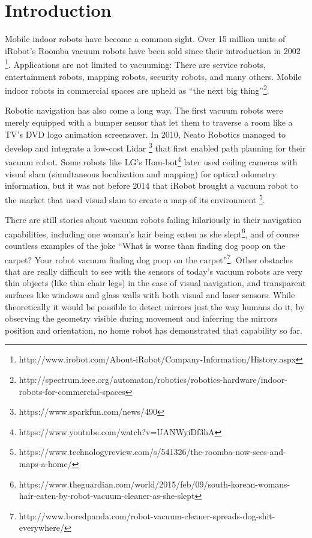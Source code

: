 \chapter{Introduction}\label{introduction}

Mobile indoor robots have become a common sight. Over 15 million units
of iRobot's Roomba vacuum robots have been sold since their introduction
in 2002 \footnote{http://www.irobot.com/About-iRobot/Company-Information/History.aspx}.
Applications are not limited to vacuuming: There are service robots,
entertainment robots, mapping robots, security robots, and many others.
Mobile indoor robots in commercial spaces are upheld as ``the next big
thing''\footnote{http://spectrum.ieee.org/automaton/robotics/robotics-hardware/indoor-robots-for-commercial-spaces}.

Robotic navigation has also come a long way. The first vacuum robots
were merely equipped with a bumper sensor that let them to traverse a
room like a TV's DVD logo animation screensaver. In 2010, Neato Robotics
managed to develop and integrate a low-cost Lidar
\footnote{https://www.sparkfun.com/news/490} that first enabled path
planning for their vacuum robot. Some robots like LG's
Hom-bot\footnote{https://www.youtube.com/watch?v=UANWyiDf3hA} later used
ceiling cameras with visual slam (simultaneous localization and mapping)
for optical odometry information, but it was not before 2014 that iRobot
brought a vacuum robot to the market that used visual slam to create a
map of its environment \footnote{https://www.technologyreview.com/s/541326/the-roomba-now-sees-and-maps-a-home/}.

There are still stories about vacuum robots failing hilariously in their
navigation capabilities, including one woman's hair being eaten as she
slept\footnote{https://www.theguardian.com/world/2015/feb/09/south-korean-womans-hair-eaten-by-robot-vacuum-cleaner-as-she-slept},
and of course countless examples of the joke ``What is worse than
finding dog poop on the carpet? Your robot vacuum finding dog poop on
the carpet''\footnote{http://www.boredpanda.com/robot-vacuum-cleaner-spreads-dog-shit-everywhere/}.
Other obstacles that are really difficult to see with the sensors of
today's vacuum robots are very thin objects (like thin chair legs) in
the case of visual navigation, and transparent surfaces like windows and
glass walls with both visual and laser sensors. While theoretically it
would be possible to detect mirrors just the way humans do it, by
observing the geometry visible during movement and inferring the mirrors
position and orientation, no home robot has demonstrated that capability
so far.

